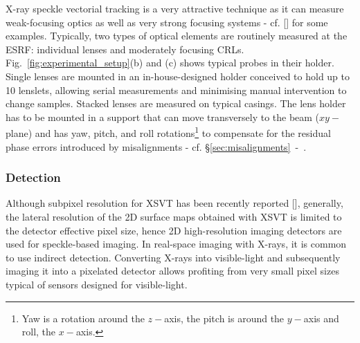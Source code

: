 \begin{refsection}
X-ray speckle vectorial tracking is a very attractive technique as it can measure weak-focusing optics as well as very strong focusing systems - cf. [\cite{Berujon2020a}] for some examples. Typically, two types of optical elements are routinely measured at the ESRF: individual lenses and moderately focusing CRLs. Fig.~\ref{fig:experimental_setup}(b) and (c) shows typical probes in their holder. Single lenses are mounted in an in-house-designed holder conceived to hold up to 10 lenslets, allowing serial measurements and minimising manual intervention to change samples. Stacked lenses are measured on typical casings. The lens holder has to be mounted in a support that can move transversely to the beam ($xy-$plane) and has yaw, pitch, and roll rotations\footnote{Yaw is a rotation around the $z-$axis, the pitch is around the $y-$axis and roll, the $x-$axis.} to compensate for the residual phase errors introduced by misalignments - cf. \S\ref{sec:misalignments}~-~\textit{}. 

\subsubsection*{Detection}

Although subpixel resolution for XSVT has been recently reported [\cite{Qiao2020b}], generally, the lateral resolution of the 2D surface maps obtained with XSVT is limited to the detector effective pixel size, hence 2D high-resolution imaging detectors are used for speckle-based imaging. In real-space imaging with X-rays, it is common to use indirect detection. Converting X-rays into visible-light and subsequently imaging it into a pixelated detector allows profiting from very small pixel sizes typical of sensors designed for visible-light.


\end{refsection}
